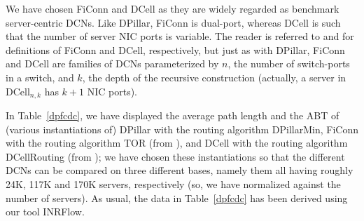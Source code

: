 \documentclass{article}
\begin{document}
We have chosen FiConn and DCell as they are widely regarded as benchmark server-centric DCNs. Like DPillar, FiConn is  dual-port, whereas DCell is such that the number of server NIC ports is variable. The reader is referred to \cite{LGW09} and \cite{GWT08} for definitions of FiConn and DCell, respectively, but just as with DPillar, FiConn and DCell are families of DCNs parameterized by $n$, the number of switch-ports in a switch, and $k$, the depth of the recursive construction (actually, a server in DCell$_{n,k}$ has $k+1$ NIC ports).

In Table~\ref{dpfcdc}, we have displayed the average path length and the ABT of (various instantiations of) DPillar with the routing algorithm DPillarMin, FiConn with the routing algorithm TOR (from \cite{LGW09}), and DCell with the routing algorithm DCellRouting (from \cite{GWT08}); we have chosen these instantiations so that the different DCNs can be compared on three different bases, namely them all having roughly 24K, 117K and 170K servers, respectively (so, we have normalized against the number of servers). As usual, the data in Table~\ref{dpfcdc} has been derived using our tool INRFlow. 
\end{document}
